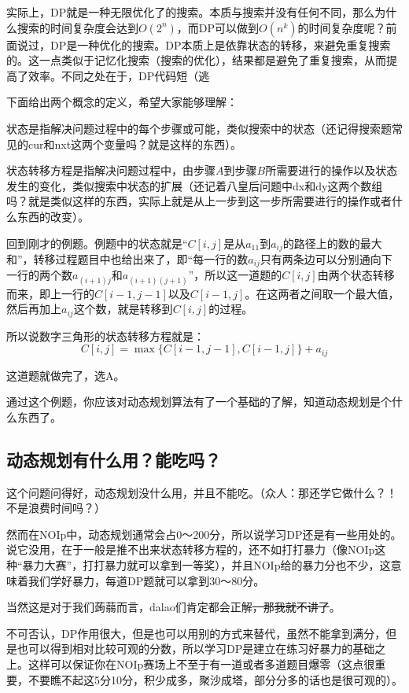 实际上，DP就是一种无限优化了的搜索。本质与搜索并没有任何不同，那么为什么搜索的时间复杂度会达到$O(2^n)$，而DP可以做到$O(n^k)$的时间复杂度呢？前面说过，DP是一种优化的搜索。DP本质上是依靠状态的转移，来避免重复搜索的。这一点类似于记忆化搜索（搜索的优化），结果都是避免了重复搜索，从而提高了效率。不同之处在于，DP代码短（逃

下面给出两个概念的定义，希望大家能够理解：
\begin{definition}[状态]
	状态是指解决问题过程中的每个步骤或可能，类似搜索中的状态（还记得搜索题常见的cur和nxt这两个变量吗？就是这样的东西）。
\end{definition}
\begin{definition}[状态转移方程]
	状态转移方程是指解决问题过程中，由步骤$A$到步骤$B$所需要进行的操作以及状态发生的变化，类似搜索中状态的扩展（还记着八皇后问题中dx和dy这两个数组吗？就是类似这样的东西，实际上就是从上一步到这一步所需要进行的操作或者什么东西的改变）。
\end{definition}

回到刚才的例题。例题中的状态就是“$C[i,j]$是从$a_{11}$到$a_{ij}$的路径上的数的最大和”，转移过程题目中也给出来了，即“每一行的数$a_{ij}$只有两条边可以分别通向下一行的两个数$a_{(i+1)j}$和$a_{(i+1)(j+1)}$”，所以这一道题的$C[i,j]$由两个状态转移而来，即上一行的$C[i-1,j-1]$以及$C[i-1,j]$。在这两者之间取一个最大值，然后再加上$a_{ij}$这个数，就是转移到$C[i,j]$的过程。

所以说数字三角形的状态转移方程就是：
\begin{equation*}
	C[i,j]=\max\{C[i-1,j-1],C[i-1,j]\}+a_{ij}
\end{equation*}

这道题就做完了，选A。

通过这个例题，你应该对动态规划算法有了一个基础的了解，知道动态规划是个什么东西了。
\subsection{动态规划有什么用？能吃吗？}
这个问题问得好，动态规划没什么用，并且不能吃。（众人：那还学它做什么？！不是浪费时间吗？）

然而在NOIp中，动态规划通常会占0～200分，所以说学习DP还是有一些用处的。说它没用，在于一般是推不出来状态转移方程的，还不如打打暴力（像NOIp这种“暴力大赛”，打打暴力就可以拿到一等奖），并且NOIp给的暴力分也不少，这意味着我们学好暴力，每道DP题就可以拿到30～80分。

当然这是对于我们蒟蒻而言，dalao们肯定都会正解\sout{，那我就不讲了}。

不可否认，DP作用很大，但是也可以用别的方式来替代，虽然不能拿到满分，但是也可以得到相对比较可观的分数，所以学习DP是建立在练习好暴力的基础之上。这样可以保证你在NOIp赛场上不至于有一道或者多道题目爆零（这点很重要，不要瞧不起这5分10分，积少成多，聚沙成塔，部分分多的话也是很可观的）。

